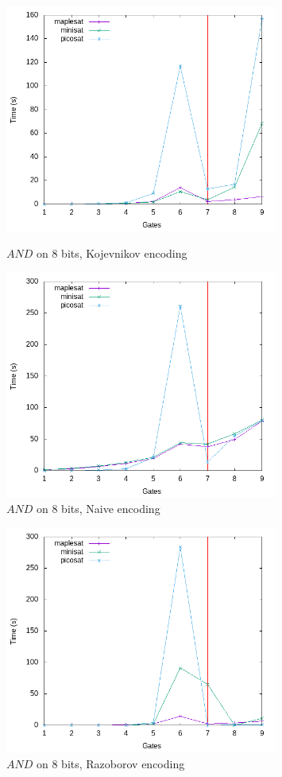 \documentclass{article}
\begin{document}
\begin{figure}[h!]
\centering

  \includegraphics[width=0.8\textwidth]{images/times/8and_kulikov.png}  
  \caption{$AND$ on 8 bits, Kojevnikov encoding}
  \includegraphics[width=0.8\textwidth]{images/times/8and_naive.png}  
  \caption{$AND$ on 8 bits, Naive encoding}
\end{figure}
\begin{figure}[h!]
\centering

  \includegraphics[width=0.8\textwidth]{images/times/8and_raz.png}  
  \caption{$AND$ on 8 bits, Razoborov encoding}
\end{figure}
\end{document}
